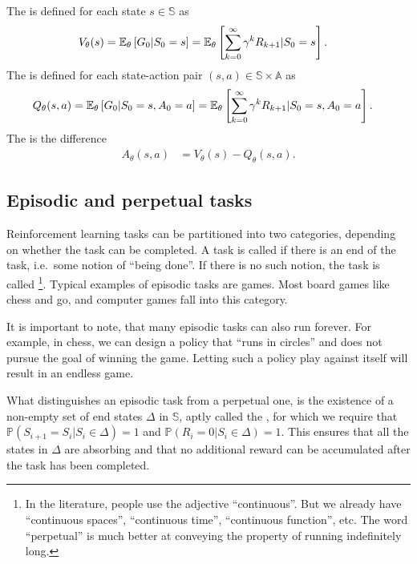\documentclass[a4paper,12pt]{amsart}
\newcommand{\stateSpace}{\mathbb S}
\newcommand{\coffinSpace}{\Delta}
\newcommand{\actionSpace}{\mathbb A}
\newcommand{\stateValueFunc}{V}
\newcommand{\actionValueFunc}{Q}
\newcommand{\advantageFunc}{A}
\newcommand{\discountFactor}{\gamma}
\newcommand{\prob}{\mathbb P}
\begin{document}
The  is defined for each state $s\in\stateSpace$ as
\begin{align}
    \stateValueFunc_{\theta}(s) &= \E_{\theta} \left[ G_0 | S_{0} = s \right] =
    \E_{\theta}\left[\sum_{k=0}^{\infty} \discountFactor^{k} R_{k+1} | 
        S_{0} = s \right].
    \label{def:state-value-function}
\end{align}
The  is defined for each state-action pair
$(s,a)\in\stateSpace\times\actionSpace$ as
\begin{align}
    \actionValueFunc_{\theta}(s,a) &= \E_{\theta} \left[ G_0 | S_0 = s, A_{0} = a \right] = 
    \E_{\theta}\left[\sum_{k=0}^{\infty} \discountFactor^{k} R_{k+1} | 
        S_0 = s, A_{0} = a \right].
    \label{def:action-value-function}
\end{align}
The  is the difference
\begin{align}
    \advantageFunc_{\theta}(s,a) &= V_{\theta}(s) - Q_{\theta}(s,a).
    \label{def:advantage-function}
\end{align}

\subsection{Episodic and perpetual tasks} 
Reinforcement learning tasks can be partitioned into two categories, depending
on whether the task can be completed. A task is called  if
there is an end of the task, i.e.\ some notion of ``being done''.
If there is no such notion, the task is called 
\footnote{In the literature, people use the adjective ``continuous''.
    But we already have ``continuous spaces'', ``continuous time'', ``continuous function'', etc.
    The word ``perpetual'' is much better at conveying the property 
    of running indefinitely long. 
}.
Typical examples of episodic tasks are games. Most board games like chess and
go, and computer games fall into this category.

It is important to note, that many episodic tasks can also run 
forever. For example, in chess, we can design a policy that ``runs in circles''
and does not pursue the goal of winning the game. Letting such a 
policy play against itself will result in an endless game.

What distinguishes an episodic task from a perpetual one, is the existence of
a non-empty set of end states $\coffinSpace$ in $\stateSpace$, aptly called the
, for which we require that $\prob\left( S_{i+1} = S_{i} |
S_{i} \in \coffinSpace \right) = 1$ and $\prob\left( R_{i} = 0 | S_{i} \in
\coffinSpace \right) = 1$. This ensures that all the states in $\coffinSpace$
are absorbing and that no additional reward can be accumulated after the task
has been completed.
\end{document}
